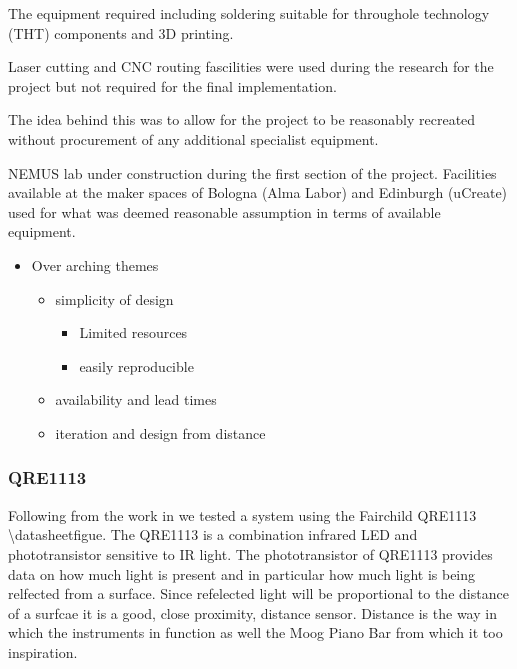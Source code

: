 The equipment required including soldering suitable for throughole
technology (THT) components and 3D printing.

Laser cutting and CNC routing fascilities were used during the research
for the project but not required for the final implementation.

The idea behind this was to allow for the project to be reasonably
recreated without procurement of any additional specialist equipment.

NEMUS lab under construction during the first section of the project.
Facilities available at the maker spaces of Bologna (Alma Labor) and
Edinburgh (uCreate) used for what was deemed reasonable assumption in
terms of available equipment.

\begin{itemize}
\item
  Over arching themes

  \begin{itemize}
  \item
    simplicity of design

    \begin{itemize}
    \item
      Limited resources
    \item
      easily reproducible
    \end{itemize}
  \item
    availability and lead times
  \item
    iteration and design from distance
  \end{itemize}
\end{itemize}

\subsubsection{QRE1113}\label{qre1113}

Following from the work in \cite{McPherson2013, McPherson2019} we tested
a system using the Fairchild QRE1113 \textbackslash datasheetfigue. The
QRE1113 is a combination infrared LED and phototransistor sensitive to
IR light. The phototransistor of QRE1113 provides data on how much light
is present and in particular how much light is being relfected from a
surface. Since refelected light will be proportional to the distance of
a surfcae it is a good, close proximity, distance sensor. Distance is
the way in which the instruments in \cite{McPherson2013, McPherson2019}
function as well the Moog Piano Bar from which it too inspiration.


